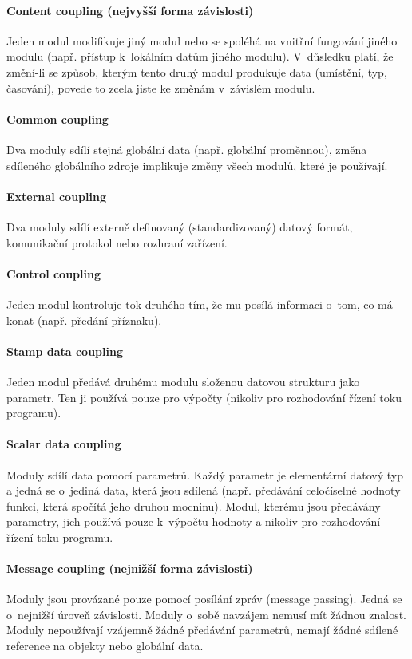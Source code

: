 \paragraph{Content coupling (nejvyšší forma závislosti)} Jeden modul modifikuje jiný modul nebo se spoléhá na vnitřní fungování jiného modulu (např. přístup k~lokálním datům jiného modulu). V~důsledku platí, že změní-li se způsob, kterým tento druhý modul produkuje data (umístění, typ, časování), povede to zcela jiste ke změnám v~závislém modulu.

\paragraph{Common coupling} Dva moduly sdílí stejná globální data (např. globální proměnnou), změna sdíleného globálního zdroje implikuje změny všech modulů, které je používají.

\paragraph{External coupling} Dva moduly sdílí externě definovaný (standardizovaný) datový formát, komunikační protokol nebo rozhraní zařízení.

\paragraph{Control coupling} Jeden modul kontroluje tok druhého tím, že mu posílá informaci o~tom, co má konat (např. předání  příznaku).

\paragraph{Stamp data coupling} Jeden modul předává druhému modulu složenou datovou strukturu jako parametr. Ten ji používá pouze pro výpočty (nikoliv pro rozhodování řízení toku programu).

\paragraph{Scalar data coupling} Moduly sdílí data pomocí parametrů. Každý parametr je elementární datový typ a jedná se o~jediná data, která jsou sdílená (např. předávání celočíselné hodnoty funkci, která spočítá jeho druhou mocninu). Modul, kterému jsou předávány parametry, jich používá pouze k~výpočtu hodnoty a nikoliv pro rozhodování řízení toku programu.

\paragraph{Message coupling (nejnižší forma závislosti)} Moduly jsou provázané pouze pomocí posílání zpráv (message passing). Jedná se o~nejnižší úroveň závislosti. Moduly o~sobě navzájem nemusí mít žádnou znalost. Moduly nepoužívají vzájemně žádné předávání parametrů, nemají žádné sdílené reference na objekty nebo globální data.

